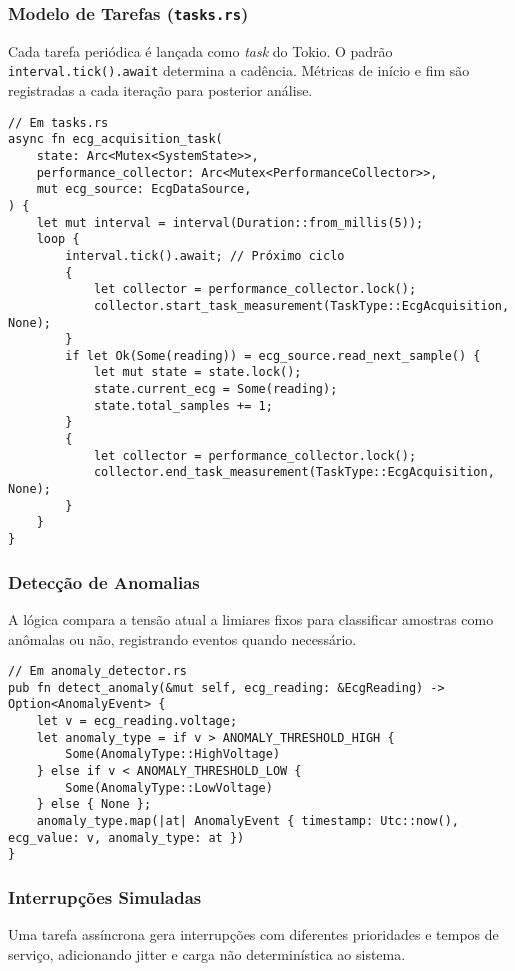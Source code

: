 \documentclass[conference]{IEEEtran}
\begin{document}
\subsubsection{Modelo de Tarefas (\texttt{tasks.rs})}
Cada tarefa periódica é lançada como \emph{task} do Tokio. O padrão \texttt{interval.tick().await} determina a cadência. Métricas de início e fim são registradas a cada iteração para posterior análise.

\begin{lstlisting}[caption={Laço periódico da aquisição de ECG.}, label={lst:task_loop_alt}]
// Em tasks.rs
async fn ecg_acquisition_task(
    state: Arc<Mutex<SystemState>>,
    performance_collector: Arc<Mutex<PerformanceCollector>>,
    mut ecg_source: EcgDataSource,
) {
    let mut interval = interval(Duration::from_millis(5));
    loop {
        interval.tick().await; // Próximo ciclo
        {
            let collector = performance_collector.lock();
            collector.start_task_measurement(TaskType::EcgAcquisition, None);
        }
        if let Ok(Some(reading)) = ecg_source.read_next_sample() {
            let mut state = state.lock();
            state.current_ecg = Some(reading);
            state.total_samples += 1;
        }
        {
            let collector = performance_collector.lock();
            collector.end_task_measurement(TaskType::EcgAcquisition, None);
        }
    }
}
\end{lstlisting}

\subsubsection{Detecção de Anomalias}
A lógica compara a tensão atual a limiares fixos para classificar amostras como anômalas ou não, registrando eventos quando necessário.

\begin{lstlisting}[caption={Regra simples de detecção.}, label={lst:anomaly_alt}]
// Em anomaly_detector.rs
pub fn detect_anomaly(&mut self, ecg_reading: &EcgReading) -> Option<AnomalyEvent> {
    let v = ecg_reading.voltage;
    let anomaly_type = if v > ANOMALY_THRESHOLD_HIGH {
        Some(AnomalyType::HighVoltage)
    } else if v < ANOMALY_THRESHOLD_LOW {
        Some(AnomalyType::LowVoltage)
    } else { None };
    anomaly_type.map(|at| AnomalyEvent { timestamp: Utc::now(), ecg_value: v, anomaly_type: at })
}
\end{lstlisting}

\subsubsection{Interrupções Simuladas}
Uma tarefa assíncrona gera interrupções com diferentes prioridades e tempos de serviço, adicionando jitter e carga não determinística ao sistema.
\end{document}
